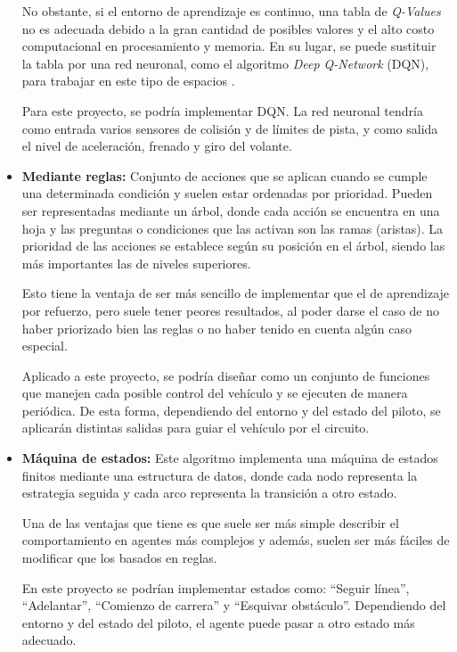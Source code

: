\begin{itemize}
   No obstante, si el entorno de aprendizaje es continuo, una tabla de \textit{Q-Values} no es adecuada debido a la gran cantidad de posibles valores y el alto costo computacional en procesamiento y memoria. En su lugar, se puede sustituir la tabla por una red neuronal, como el algoritmo \textit{Deep Q-Network} (DQN), para trabajar en este tipo de espacios \cite{coulom:tel-00003985}.

   Para este proyecto, se podría implementar DQN. La red neuronal tendría como entrada varios sensores de colisión y de límites de pista, y como salida el nivel de aceleración, frenado y giro del volante.

   \item \textbf{Mediante reglas:} Conjunto de acciones que se aplican cuando se cumple una determinada condición y suelen estar ordenadas por prioridad. Pueden ser representadas mediante un árbol, donde cada acción se encuentra en una hoja y las preguntas o condiciones que las activan son las ramas (aristas). La prioridad de las acciones se establece según su posición en el árbol, siendo las más importantes las de niveles superiores.
   
   Esto tiene la ventaja de ser más sencillo de implementar que el de aprendizaje por refuerzo, pero suele tener peores resultados, al poder darse el caso de no haber priorizado bien las reglas o no haber tenido en cuenta algún caso especial.


   Aplicado a este proyecto, se podría diseñar como un conjunto de funciones que manejen cada posible control del vehículo y se ejecuten de manera periódica. De esta forma, dependiendo del entorno y del estado del piloto, se aplicarán distintas salidas para guiar el vehículo por el circuito.

   \item \textbf{Máquina de estados:} Este algoritmo implementa una máquina de estados finitos mediante una estructura de datos, donde cada nodo representa la estrategia seguida y cada arco representa la transición a otro estado. 
   
   Una de las ventajas que tiene es que suele ser más simple describir el comportamiento en agentes más complejos y además, suelen ser más fáciles de modificar que los basados en reglas.

   En este proyecto se podrían implementar estados como: ``Seguir línea'', ``Adelantar'', ``Comienzo de carrera'' y ``Esquivar obstáculo''. Dependiendo del entorno y del estado del piloto, el agente puede pasar a otro estado más adecuado.


\end{itemize}
